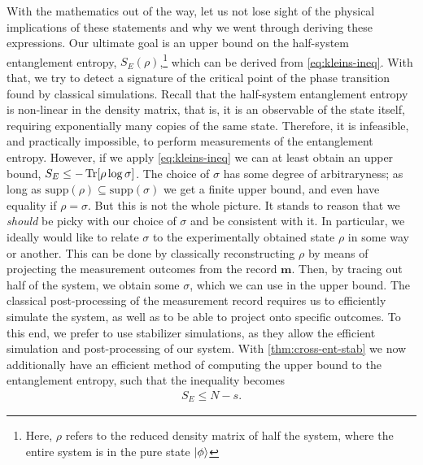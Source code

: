 With the mathematics out of the way, let us not lose sight of the physical
implications of these statements and why we went through deriving these
expressions. Our ultimate goal is an upper bound on the half-system
entanglement entropy, $S_E\left( \rho \right)$,\footnote{Here, $\rho$ refers to
  the reduced density matrix of half the system, where the entire system is in
the pure state $\ket{\phi}$} which can be derived
from \cref{eq:kleins-ineq}. With that, we try to detect a signature of the
critical point of the phase transition found by classical simulations. Recall
that
the half-system entanglement entropy is non-linear in the density matrix, that
is, it is an observable of the state itself, requiring exponentially many
copies of the same state. Therefore, it is infeasible, and practically
impossible, to perform measurements of the entanglement entropy. However, if we
apply \cref{eq:kleins-ineq} we can at least obtain an upper bound, $S_E\leq
-\Tr[\rho\log\sigma]$. The
choice of $\sigma$ has some degree of arbitraryness; as long as
$\mathrm{supp}\left( \rho \right) \subseteq \mathrm{supp}\left( \sigma \right)$
we get a finite upper bound, and even have equality if $\rho = \sigma$.
But this is not the whole picture. It stands to
reason that we \emph{should} be picky with our choice of $\sigma$ and be
consistent with it. In particular, we ideally would like to 
relate $\sigma$ to the experimentally obtained state $\rho$ in some way or
another. This can be done by classically reconstructing $\rho$ by means of
projecting the measurement outcomes from the record $\mathbf{m}$.
Then, by tracing out half of the system, we obtain some $\sigma$, which we can
use in the upper bound. The classical post-processing of the measurement record
requires us to efficiently simulate the system, as well as to be able to
project onto specific outcomes. To this end, we prefer to use stabilizer
simulations, as they allow the efficient simulation and post-processing of our
system. With \cref{thm:cross-ent-stab} we now additionally have an efficient
method of computing the upper bound to the entanglement entropy, such that the
inequality becomes
\begin{align}
  S_E \leq N-s
.\end{align}

